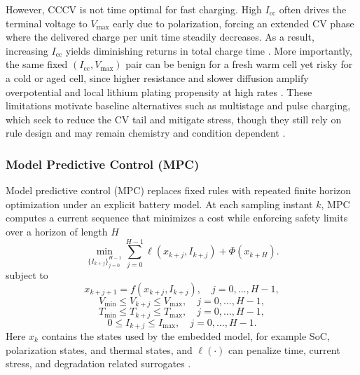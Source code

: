 \documentclass[%
 aip,
 amsmath,amssymb,
reprint, onecolumn %
]{revtex4-1}
\begin{document}
However, CCCV is not time optimal for fast charging. High $I_{\mathrm{cc}}$ often drives the terminal voltage to $V_{\max}$ early due to polarization, forcing an extended CV phase where the delivered charge per unit time steadily decreases. As a result, increasing $I_{\mathrm{cc}}$ yields diminishing returns in total charge time \cite{tomaszewska2019lithium}. More importantly, the same fixed $(I_{\mathrm{cc}},V_{\max})$ pair can be benign for a fresh warm cell yet risky for a cold or aged cell, since higher resistance and slower diffusion amplify overpotential and local lithium plating propensity at high rates \cite{waldmann2014optimization,tomaszewska2019lithium}. These limitations motivate baseline alternatives such as multistage and pulse charging, which seek to reduce the CV tail and mitigate stress, though they still rely on rule design and may remain chemistry and condition dependent \cite{beh2019pulse,tomaszewska2019lithium}.

\subsubsection{\label{subsubsec:mpc}Model Predictive Control (MPC)}

Model predictive control (MPC) replaces fixed rules with repeated finite horizon optimization under an explicit battery model. At each sampling instant $k$, MPC computes a current sequence that minimizes a cost while enforcing safety limits over a horizon of length $H$
\begin{equation}
\min_{\{I_{k+j}\}_{j=0}^{H-1}}
\sum_{j=0}^{H-1} \ell(x_{k+j}, I_{k+j}) + \Phi(x_{k+H}).
\end{equation}
subject to
\begin{equation}
x_{k+j+1} = f(x_{k+j}, I_{k+j}), \quad j=0,\ldots,H-1,
\end{equation}
\begin{equation}
V_{\min} \le V_{k+j} \le V_{\max}, \quad j=0,\ldots,H-1,
\end{equation}
\begin{equation}
T_{\min} \le T_{k+j} \le T_{\max}, \quad j=0,\ldots,H-1,
\end{equation}
\begin{equation}
0 \le I_{k+j} \le I_{\max}, \quad j=0,\ldots,H-1.
\end{equation}
Here $x_k$ contains the states used by the embedded model, for example SoC, polarization states, and thermal states, and $\ell(\cdot)$ can penalize time, current stress, and degradation related surrogates \cite{liu2018charging,krewer2018review}.
\end{document}
